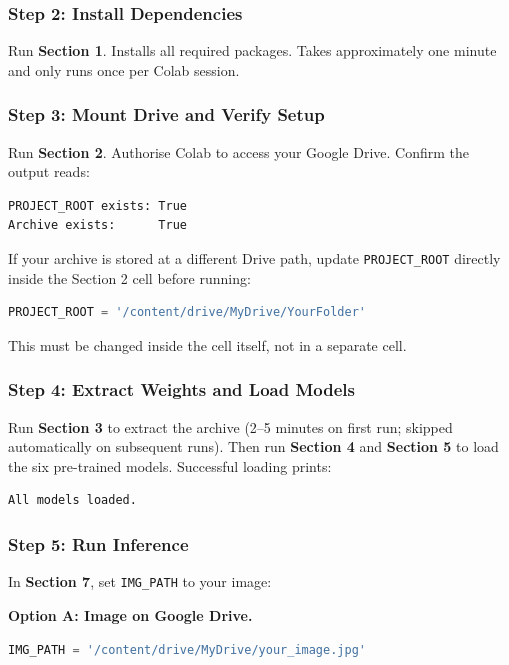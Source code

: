 \documentclass[12pt,a4paper]{article}
\begin{document}
\subsubsection{Step 2: Install Dependencies}

Run \textbf{Section 1}. Installs all required packages. Takes approximately
one minute and only runs once per Colab session.

\subsubsection{Step 3: Mount Drive and Verify Setup}

Run \textbf{Section 2}. Authorise Colab to access your Google Drive.
Confirm the output reads:

\begin{lstlisting}
PROJECT_ROOT exists: True
Archive exists:      True
\end{lstlisting}

If your archive is stored at a different Drive path, update
\texttt{PROJECT\_ROOT} directly inside the Section 2 cell before running:

\begin{lstlisting}[language=Python]
PROJECT_ROOT = '/content/drive/MyDrive/YourFolder'
\end{lstlisting}

This must be changed inside the cell itself, not in a separate cell.

\subsubsection{Step 4: Extract Weights and Load Models}

Run \textbf{Section 3} to extract the archive (2--5 minutes on first run;
skipped automatically on subsequent runs). Then run \textbf{Section 4}
and \textbf{Section 5} to load the six pre-trained models. Successful
loading prints:

\begin{lstlisting}
All models loaded.
\end{lstlisting}

\subsubsection{Step 5: Run Inference}

In \textbf{Section 7}, set \texttt{IMG\_PATH} to your image:

\textbf{Option A: Image on Google Drive.}
\begin{lstlisting}[language=Python]
IMG_PATH = '/content/drive/MyDrive/your_image.jpg'
\end{lstlisting}
\end{document}
